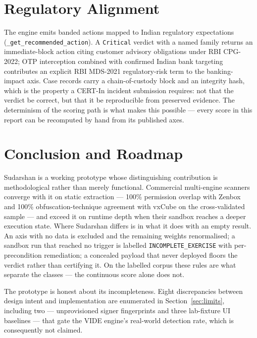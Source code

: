 \documentclass{article}
\begin{document}
\section{Regulatory Alignment}
\label{sec:reg}

The engine emits banded actions mapped to Indian regulatory expectations
(\texttt{\_get\_recommended\_action}). A \texttt{Critical} verdict with a named
family returns an immediate-block action citing customer advisory obligations
under RBI CPG-2022; OTP interception combined with confirmed Indian bank
targeting contributes an explicit RBI MDS-2021 regulatory-risk term to the
banking-impact axis. Case records carry a chain-of-custody block and an
integrity hash, which is the property a CERT-In incident submission requires:
not that the verdict be correct, but that it be reproducible from preserved
evidence. The determinism of the scoring path is what makes this possible ---
every score in this report can be recomputed by hand from its published axes.

\section{Conclusion and Roadmap}
\label{sec:conclusion}

Sudarshan is a working prototype whose distinguishing contribution is
methodological rather than merely functional. Commercial multi-engine scanners
converge with it on static extraction --- 100\% permission overlap with Zenbox
and 100\% obfuscation-technique agreement with vxCube on the cross-validated
sample --- and exceed it on runtime depth when their sandbox reaches a deeper
execution state. Where Sudarshan differs is in what it does with an empty
result. An axis with no data is excluded and the remaining weights renormalised;
a sandbox run that reached no trigger is labelled \texttt{INCOMPLETE\_EXERCISE}
with per-precondition remediation; a concealed payload that never deployed
floors the verdict rather than certifying it. On the labelled corpus these rules
are what separate the classes --- the continuous score alone does not.

The prototype is honest about its incompleteness. Eight discrepancies between
design intent and implementation are enumerated in Section~\ref{sec:limits},
including two --- unprovisioned signer fingerprints and three lab-fixture UI
baselines --- that gate the VIDE engine's real-world detection rate, which is
consequently not claimed.
\end{document}
